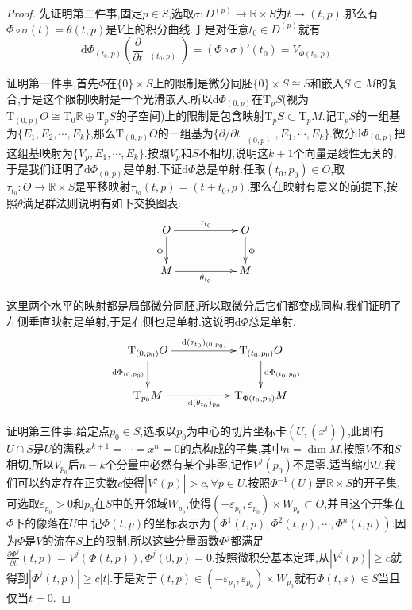 \begin{enumerate}
\begin{proof}
    	先证明第二件事,固定$p\in S$,选取$\sigma:D^{(p)}\to\mathbb{R}\times S$为$t\mapsto(t,p)$.那么有$\Phi\circ\sigma(t)=\theta(t,p)$是$V$上的积分曲线.于是对任意$t_0\in D^{(p)}$就有:
    	$$\mathrm{d}\Phi_{(t_0,p)}\left(\frac{\partial}{\partial t}\mid_{(t_0,p)}\right)=(\Phi\circ\sigma)'(t_0)=V_{\Phi(t_0,p)}$$
    	
    	证明第一件事,首先$\Phi$在$\{0\}\times S$上的限制是微分同胚$\{0\}\times S\cong S$和嵌入$S\subset M$的复合,于是这个限制映射是一个光滑嵌入.所以$\mathrm{d}\Phi_{(0,p)}$在$\mathrm{T}_pS$(视为$\mathrm{T}_{(0,p)}O\cong\mathrm{T}_0\mathbb{R}\oplus\mathrm{T}_pS$的子空间)上的限制是包含映射$\mathrm{T}_pS\subset\mathrm{T}_pM$.记$\mathrm{T}_pS$的一组基为$\{E_1,E_2,\cdots,E_k\}$,那么$\mathrm{T}_{(0,p)}O$的一组基为$\{\partial/\partial t\mid_{(0,p)},E_1,\cdots,E_k\}$.微分$\mathrm{d}\Phi_{(0,p)}$把这组基映射为$\{V_p,E_1,\cdots,E_k\}$.按照$V_p$和$S$不相切,说明这$k+1$个向量是线性无关的,于是我们证明了$\mathrm{d}\Phi_{(0,p)}$是单射.下证$\mathrm{d}\Phi$总是单射.任取$(t_0,p_0)\in O$,取$\tau_{t_0}:O\to\mathbb{R}\times S$是平移映射$\tau_{t_0}(t,p)=(t+t_0,p)$.那么在映射有意义的前提下,按照$\theta$满足群法则说明有如下交换图表:
    	$$\xymatrix{O\ar[rr]^{\tau_{t_0}}\ar[d]_{\Phi}&&O\ar[d]^{\Phi}\\M\ar[rr]_{\theta_{t_0}}&&M}$$
    	
    	这里两个水平的映射都是局部微分同胚,所以取微分后它们都变成同构.我们证明了左侧垂直映射是单射,于是右侧也是单射.这说明$\mathrm{d}\Phi$总是单射.
    	$$\xymatrix{\mathrm{T}_{(0,p_0)}O\ar[rr]^{\mathrm{d}(\tau_{t_0})_{(0,p_0)}}\ar[d]_{\mathrm{d}\Phi_{(0,p_0)}}&&\mathrm{T}_{(t_0,p_0)}O\ar[d]^{\mathrm{d}\Phi_{(t_0,p_0)}}\\\mathrm{T}_{p_0}M\ar[rr]_{\mathrm{d}(\theta_{t_0})_{p_0}}&&\mathrm{T}_{\Phi(t_0,p_0)}M}$$
    	
    	证明第三件事.给定点$p_0\in S$,选取以$p_0$为中心的切片坐标卡$(U,(x^i))$,此即有$U\cap S$是$U$的满秩$x^{k+1}=\cdots=x^n=0$的点构成的子集,其中$n=\dim M$.按照$V$不和$S$相切,所以$V_{p_0}$后$n-k$个分量中必然有某个非零,记作$V^j(p_0)$不是零.适当缩小$U$,我们可以约定存在正实数$c$使得$|V^j(p)|>c,\forall p\in U$.按照$\Phi^{-1}(U)$是$\mathbb{R}\times S$的开子集,可选取$\varepsilon_{p_0}>0$和$p_0$在$S$中的开邻域$W_{p_0}$,使得$(-\varepsilon_{p_0},\varepsilon_{p_0})\times W_{p_0}\subset O$,并且这个开集在$\Phi$下的像落在$U$中.记$\Phi(t,p)$的坐标表示为$(\Phi^1(t,p),\Phi^2(t,p),\cdots,\Phi^n(t,p))$.因为$\Phi$是$V$的流在$S$上的限制,所以这些分量函数$\Phi^j$都满足$\frac{\partial\Phi^j}{\partial t}(t,p)=V^j(\Phi(t,p)),\Phi^j(0,p)=0$.按照微积分基本定理,从$|V^j(p)|\ge c$就得到$|\Phi^j(t,p)|\ge c|t|$.于是对于$(t,p)\in(-\varepsilon_{p_0},\varepsilon_{p_0})\times W_{p_0}$就有$\Phi(t,s)\in S$当且仅当$t=0$.
    	

\end{proof}
\end{enumerate}
